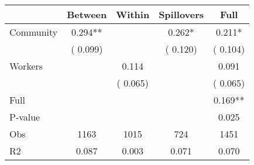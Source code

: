 
\begin{tabular}{l*{4}{c}}\hline&\multicolumn{1}{c}{Between}&\multicolumn{1}{c}{Within}&\multicolumn{1}{c}{Spillovers}&\multicolumn{1}{c}{Full}\\ \hline
 Community             &              0.294**      &                                               &        0.262* &         0.211*                            \\ 
                               &        (       0.099)           &                                       &       (       0.120)     &      (       0.104)                                           \\ 
 Workers       &                                               &        0.114    &                                &             0.091                            \\ 
                               &                                               & (       0.065)                  &                                        &      (       0.065)                                           \\ 
\hline                                                                                                                                                                                                                                            
 Full                  &                                               &                                               &                                        &             0.169**                                     \\ 
 P-value               &                                               &                                               &                                        &             0.025                                           \\ 
 Obs                   &               1163               &       1015                       &       724                &              1451                                               \\ 
 R2                    &                      0.087              &              0.003                      &              0.071               &                     0.070                                              \\ 
\hline \end{tabular}                                                                                                                                                                                                              